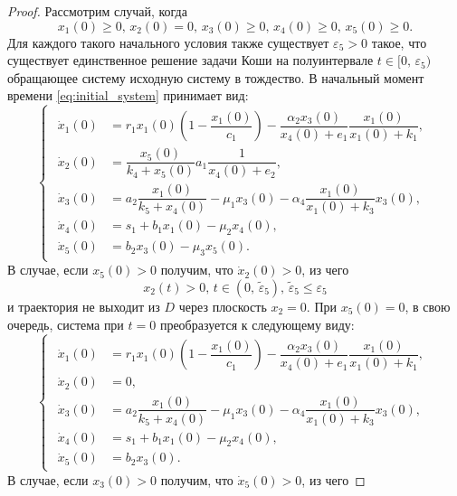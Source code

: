\documentclass[14pt,a4paper]{extarticle}
\begin{document}
\begin{proof}
		Рассмотрим случай, когда
		\begin{equation}\label{eq:conds_5}
			x_1(0)\ge0,\, x_2(0)=0,\, x_3(0)\ge0,\, x_4(0)\ge0,\, x_5(0)\ge0.
		\end{equation}
		Для каждого такого начального условия также существует $\varepsilon_5>0$ такое, что существует единственное решение задачи Коши на полуинтервале $t\in[0,\,\varepsilon_5)$ обращающее систему исходную систему в тождество. В начальный момент времени \ref{eq:initial_system} принимает вид: 
		\begin{equation*}
			\begin{cases}
				\begin{aligned}
					\dot{x}_1(0) &= r_1x_1(0)\left(1-\dfrac{x_1(0)}{c_1}\right)-\dfrac{\alpha_2x_3(0)}{x_4(0)+e_1}\dfrac{x_1(0)}{x_1(0)+k_1},\\
					\dot{x}_2(0) &= \dfrac{x_5(0)}{k_4+x_5(0)}a_1\dfrac{1}{x_4(0)+e_2},\\
					\dot{x}_3(0) &= a_2\dfrac{x_1(0)}{k_5+x_4(0)}-\mu_1x_3(0)-\alpha_4\dfrac{x_1(0)}{x_1(0)+k_3}x_3(0),\\
					\dot{x}_4(0) &= s_1 + b_1x_1(0)-\mu_2x_4(0),\\
					\dot{x}_5(0) &= b_2x_3(0)-\mu_3x_5(0).
				\end{aligned}
			\end{cases}
		\end{equation*} 
		В случае, если $x_5(0)>0$ получим, что $\dot{x}_2(0)>0$, из чего 
		\[x_2(t)>0,\, t\in(0,\, \tilde{\varepsilon}_5),\,\tilde{\varepsilon}_5\le\varepsilon_5\]
		и траектория не выходит из $D$ через плоскость $x_2=0$. При $x_5(0)=0$, в свою очередь, система при $t=0$ преобразуется к следующему виду:
		\begin{equation*}
			\begin{cases}
				\begin{aligned}
					\dot{x}_1(0) &= r_1x_1(0)\left(1-\dfrac{x_1(0)}{c_1}\right)-\dfrac{\alpha_2x_3(0)}{x_4(0)+e_1}\dfrac{x_1(0)}{x_1(0)+k_1},\\
					\dot{x}_2(0) &= 0,\\
					\dot{x}_3(0) &= a_2\dfrac{x_1(0)}{k_5+x_4(0)}-\mu_1x_3(0)-\alpha_4\dfrac{x_1(0)}{x_1(0)+k_3}x_3(0),\\
					\dot{x}_4(0) &= s_1 + b_1x_1(0)-\mu_2x_4(0),\\
					\dot{x}_5(0) &= b_2x_3(0).
				\end{aligned}
			\end{cases}
		\end{equation*}  
		В случае, если $x_3(0)>0$ получим, что $\dot{x}_5(0)>0$, из чего 

\end{proof}
\end{document}
